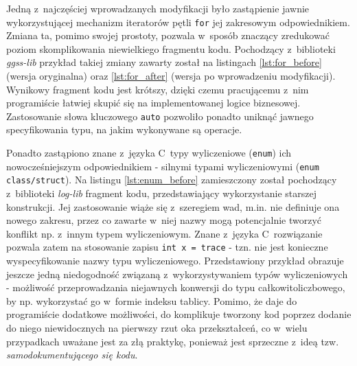 Jedną z~najczęściej wprowadzanych modyfikacji było zastąpienie jawnie wykorzystującej mechanizm iteratorów pętli \lstinline{for} jej zakresowym odpowiednikiem. Zmiana ta, pomimo swojej prostoty, pozwala w~sposób znaczący zredukować poziom skomplikowania niewielkiego fragmentu kodu. Pochodzący z~biblioteki \emph{ggss-lib} przykład takiej zmiany zawarty został na listingach \ref{lst:for_before} (wersja oryginalna) oraz \ref{lst:for_after} (wersja po wprowadzeniu modyfikacji). Wynikowy fragment kodu jest krótszy, dzięki czemu pracującemu z~nim programiście łatwiej skupić się na implementowanej logice biznesowej. Zastosowanie słowa kluczowego \lstinline{auto} pozwoliło ponadto uniknąć jawnego specyfikowania typu, na jakim wykonywane są operacje.





Ponadto zastąpiono znane z~języka C~typy wyliczeniowe (\lstinline{enum}) ich nowocześniejszym odpowiednikiem - silnymi typami wyliczeniowymi (\lstinline{enum class/struct}). Na listingu \ref{lst:enum_before} zamieszczony został pochodzący z~biblioteki \emph{log-lib} fragment kodu, przedstawiający wykorzystanie starszej konstrukcji. Jej zastosowanie wiąże się z~szeregiem wad, m.in. nie definiuje ona nowego zakresu, przez co zawarte w~niej nazwy mogą potencjalnie tworzyć konflikt np. z~innym typem wyliczeniowym. Znane z~języka C~rozwiązanie pozwala zatem na stosowanie zapisu \lstinline{int x = trace} - tzn. nie jest konieczne wyspecyfikowanie nazwy typu wyliczeniowego. Przedstawiony przykład obrazuje jeszcze jedną niedogodność związaną z~wykorzystywaniem typów wyliczeniowych - możliwość przeprowadzania niejawnych konwersji do typu całkowitoliczbowego, by np. wykorzystać go w~formie indeksu tablicy. Pomimo, że daje do programiście dodatkowe możliwości, do komplikuje tworzony kod poprzez dodanie do niego niewidocznych na pierwszy rzut oka przekształceń, co w~wielu przypadkach uważane jest za złą praktykę, ponieważ jest sprzeczne z~ideą tzw. \emph{samodokumentującego się kodu}.

